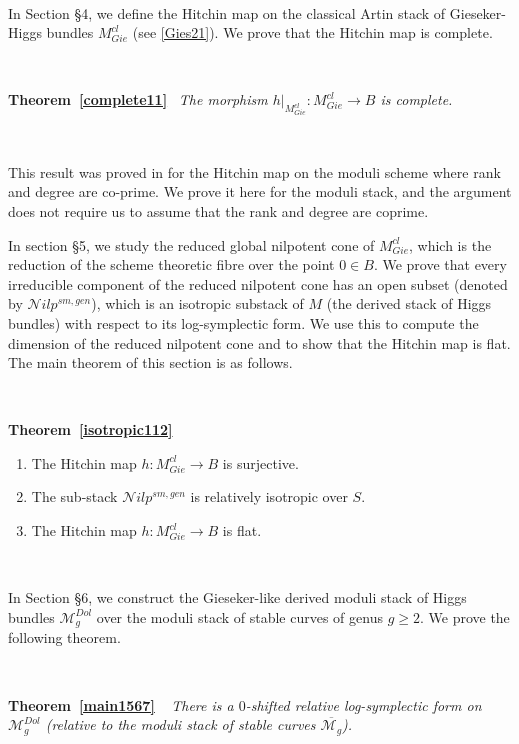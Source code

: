 \documentclass[11pt]{amsart}
\theoremstyle{plain}
\numberwithin{equation}{section}
\theoremstyle{definition}
\theoremstyle{plain}
\begin{document}
\

\noindent
In Section \S4, we define the Hitchin map on the classical Artin stack of Gieseker-Higgs bundles $M^{cl}_{Gie}$ (see \ref{Gies21}). We prove that the Hitchin map is complete.

\

\noindent
{\bfseries Theorem~\ref{complete11}} \ {\em The morphism $h|_{M^{cl}_{Gie}} \colon M^{cl}_{Gie} \longrightarrow B$ is complete.}

\

This result was proved in \cite{2a} for the Hitchin map on the moduli scheme where rank and degree are co-prime. We prove it here for the moduli stack, and the argument does not require us to assume that the rank and degree are coprime.

In section \S5, we study the reduced global nilpotent cone of $M^{cl}_{Gie}$, which is the reduction of the scheme theoretic fibre over the point $0\in B$. We prove that every irreducible component of the reduced nilpotent cone has an open subset (denoted by $\mathcal Nilp^{sm, gen}$), which is an isotropic substack of $M$ (the derived stack of Higgs bundles) with respect to its log-symplectic form. We use this to compute the dimension of the reduced nilpotent cone and to show that the Hitchin map is flat. The main theorem of this section is as follows.

\

\noindent
{\bfseries Theorem~\ref{isotropic112}}
{\em \begin{enumerate}
\item The Hitchin map $h: M^{cl}_{Gie}\longrightarrow B$ is surjective.
\item The sub-stack $\mathcal Nilp^{sm,gen}$ is relatively isotropic over $S$.
\item The Hitchin map $h: M^{cl}_{Gie}\longrightarrow B$ is flat.
\end{enumerate}
}

\

In Section \S6, we construct the Gieseker-like derived moduli stack of Higgs bundles $\mathcal M^{Dol}_g$ over the moduli stack of stable curves of genus $g\geq 2$. We prove the following theorem.

\

\noindent
{\bfseries Theorem~\ref{main1567}} \ {\em
There is a $0$-shifted relative log-symplectic form on $\mathcal M^{Dol}_g$ (relative to the moduli stack of stable curves
$\overline{\mathcal M_g}$).
}

\
\end{document}
